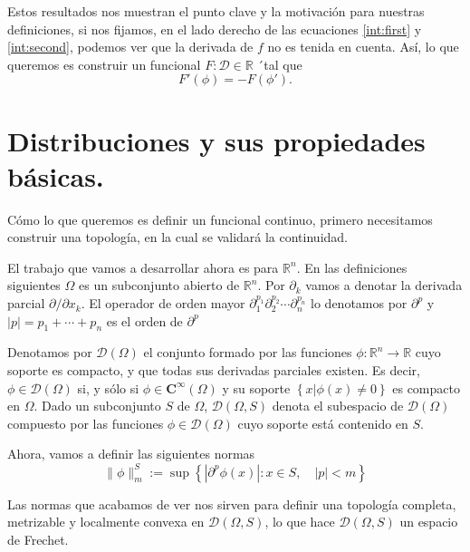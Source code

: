 \documentclass[letter,12pt]{article}
\newcommand\norm[1]{\lVert#1\rVert}
\begin{document}
Estos resultados nos muestran el punto clave y la motivación para nuestras definiciones,
si nos fijamos, en el lado derecho de las ecuaciones \ref{int:first} y
\ref{int:second}, podemos ver que la derivada de $ f $ no es tenida en cuenta.
Así, lo que queremos es construir un funcional $ F: \mathscr{D} \in \mathbb{R} $ ´tal 
que
\begin{equation}
	F'(\phi) = -F(\phi').
\end{equation}

\section{Distribuciones y sus propiedades básicas.}
Cómo lo que queremos es definir un funcional continuo, primero necesitamos construir 
una topología, en la cual se validará la continuidad.

El trabajo que vamos a desarrollar ahora es para $ \mathbb{R}^n $. En las 
definiciones siguientes $ \Omega $ es un subconjunto abierto de 
$ \mathbb{R}^n $. Por $ \partial_{k} $ vamos a denotar la derivada parcial
$ \partial/\partial{x_k} $. El operador de orden mayor 
$ \partial^{p_1}_{1} \partial^{p_2}_{2} \cdots \partial^{p_n}_{n} $ lo denotamos
por $ \partial^p $ y $ |p| = p_1 + \cdots + p_n $ es el orden de $ \partial^p $

Denotamos por $ \mathscr{D}(\Omega) $ el conjunto formado por las funciones 
$ \phi: \mathbb{R}^n \to \mathbb{R} $ cuyo soporte es compacto, y que todas sus
derivadas parciales existen. Es decir, $ \phi \in \mathscr{D}(\Omega) $ si, y sólo si
$ \phi \in \mathbf{C}^{\infty}(\Omega) $ y su soporte 
$ \left\{ x| \phi(x) \neq 0 \right\} $ es compacto en $ \Omega $.
Dado un subconjunto $ S $ de $ \Omega $, $ \mathscr{D}(\Omega, S) $ denota el 
subespacio de $ \mathscr{D}(\Omega) $ compuesto por las funciones 
$ \phi\in\mathscr{D}(\Omega) $ cuyo soporte está contenido en $ S $.

Ahora, vamos a definir las siguientes normas
\begin{equation}
 	\norm{\phi}^{S}_{m} := 
 	\sup{ \left\{ |\partial^p{\phi(x)}|: x\in S, \quad |p| < m  \right\} }
\end{equation}

Las normas que acabamos de ver nos sirven para definir una topología completa, 
metrizable y localmente convexa en $ \mathscr{D}(\Omega, S) $, lo que hace 
$ \mathscr{D}(\Omega, S) $ un espacio de Frechet.


\printbibliography
\end{document}
